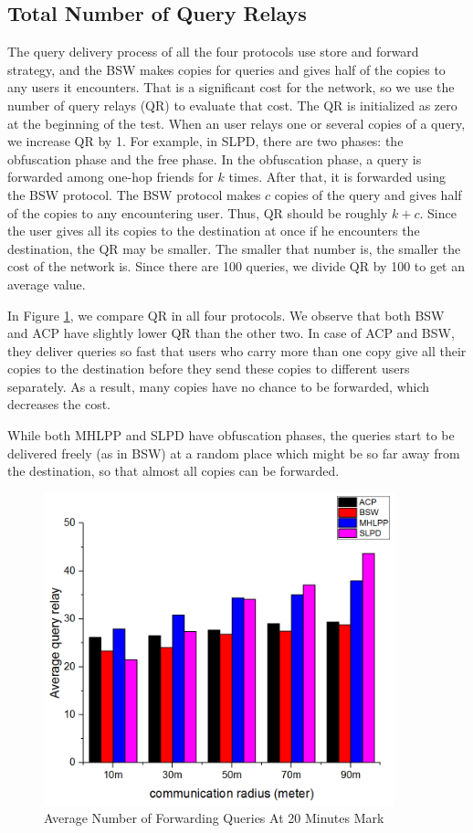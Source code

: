 \subsection{ Total Number of Query Relays}

\noindent The query delivery process of all the four protocols use store and forward strategy, and the BSW makes copies for queries and gives half of the copies to any users it encounters. That is a significant cost for the network, so we use the number of query relays (QR) to evaluate that cost. The QR is initialized as zero at the beginning of the test. When an user relays one or several copies of a query, we increase QR by 1. For example, in SLPD, there are two phases: the obfuscation phase and the free phase. In the obfuscation phase, a query is forwarded among one-hop friends for $k$ times. After that, it is forwarded using the BSW protocol. The BSW protocol makes $c$ copies of the query and gives half of the copies to any encountering user. Thus, QR should be roughly $k+c$. Since the user gives all its copies to the destination at once if he encounters the destination, the QR may be smaller. The smaller that number is, the smaller the cost of the network is. Since there are 100 queries, we divide QR by 100 to get an average value. 

In Figure \ref{fig:F418AverageTotalNumberofForwardingQueriesAt20Minutes}, we compare QR in all four protocols. We observe that both BSW and ACP have slightly lower QR than the other two. In case of ACP and BSW, they deliver queries so fast that users who carry more than one copy give all their copies to the destination before they send these copies to different users separately. As a result, many copies have no chance to be forwarded, which decreases the cost. 

While both MHLPP and SLPD have obfuscation phases, the queries start to be delivered freely (as in BSW) at a random place which might be so far away from the destination, so that almost all copies can be forwarded.

\begin{figure} [hbtp]
  \centering 
  \includegraphics[width=4.0in]{figures/F418AverageTotalNumberofForwardingQueriesAt20Minutes.png}
  \caption{Average Number of Forwarding Queries At 20 Minutes Mark} 
  \label{fig:F418AverageTotalNumberofForwardingQueriesAt20Minutes} %
\end{figure}

